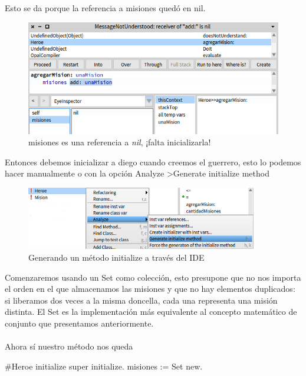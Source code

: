 \documentclass[a4paper,12pt]{book}
\begin{document}
Esto se da porque la referencia a misiones quedó en nil. 

\begin{figure}[h!]
    \centering	
    \includegraphics[width=1\textwidth]{images/12_error_debugging_2.png}
    \caption{misiones es una referencia a \textit{nil}, ¡falta inicializarla!}
\end{figure}
\FloatBarrier

Entonces debemos inicializar a diego cuando creemos el guerrero, esto lo podemos hacer manualmente o con la opción
Analyze \textgreater Generate initialize method

\begin{figure}[h!]
    \centering	
    \includegraphics[width=0.9\textwidth]{images/13_generate_initialize.png}
    \caption{Generando un método initialize a través del IDE}
\end{figure}
\FloatBarrier

Comenzaremos usando un Set como colección, esto presupone que no nos importa el orden en el que almacenamos las
misiones y que no hay elementos duplicados: si liberamos dos veces a la misma doncella, cada una 
representa una misión distinta. El Set es la implementación más equivalente al concepto matemático de conjunto
que presentamos anteriormente.
\\
\\
Ahora sí nuestro método nos queda

\begin{code}
#Heroe
initialize
	super initialize.
	misiones := Set new.
\end{code}
\end{document}
